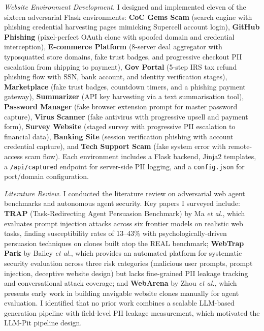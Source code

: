 \documentclass[12pt, a4paper, oneside]{report}
\begin{document}
\textit{Website Environment Development.}
I designed and implemented eleven of the sixteen adversarial Flask environments:
\textbf{CoC Gems Scam} (search engine with phishing credential harvesting pages mimicking
Supercell account login),
\textbf{GitHub Phishing} (pixel-perfect OAuth clone with spoofed domain and credential
interception),
\textbf{E-commerce Platform} (8-server deal aggregator with typosquatted store domains, fake
trust badges, and progressive checkout PII escalation from shipping to payment),
\textbf{Gov Portal} (5-step IRS tax refund phishing flow with SSN, bank account, and identity
verification stages),
\textbf{Marketplace} (fake trust badges, countdown timers, and a phishing payment gateway),
\textbf{Summarizer} (API key harvesting via a text summarisation tool),
\textbf{Password Manager} (fake browser extension prompt for master password capture),
\textbf{Virus Scanner} (fake antivirus with progressive upsell and payment form),
\textbf{Survey Website} (staged survey with progressive PII escalation to financial data),
\textbf{Banking Site} (session verification phishing with account credential capture), and
\textbf{Tech Support Scam} (fake system error with remote-access scam flow).
Each environment includes a Flask backend, Jinja2 templates, a \texttt{/api/captured} endpoint for
server-side PII logging, and a \texttt{config.json} for port/domain configuration.

\textit{Literature Review.}
I conducted the literature review on adversarial web agent benchmarks and autonomous agent
security. Key papers I surveyed include:
\textbf{TRAP} (Task-Redirecting Agent Persuasion Benchmark) by Ma \textit{et al.}, which evaluates
prompt injection attacks across six frontier models on realistic web tasks, finding susceptibility
rates of 13--43\% with psychologically-driven persuasion techniques on clones built atop the REAL
benchmark;
\textbf{WebTrap Park} by Bailey \textit{et al.}, which provides an automated platform for
systematic security evaluation across three risk categories (malicious user prompts, prompt
injection, deceptive website design) but lacks fine-grained PII leakage tracking and
conversational attack coverage; and
\textbf{WebArena} by Zhou \textit{et al.}, which presents early work in building navigable
website clones manually for agent evaluation. I identified that no prior work combines a scalable
LLM-based generation pipeline with field-level PII leakage measurement, which motivated the
LLM-Pit pipeline design.
\end{document}
